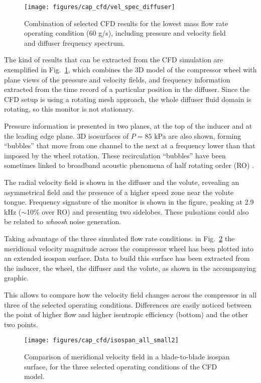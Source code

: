 \begin{figure}[htb!]
\centering
\texttt{[image: figures/cap\_cfd/vel\_spec\_diffuser]}
\caption[CFD results for the lowest mass flow rate condition]{Combination of selected CFD results for the lowest mass flow rate operating condition (60 g/s), including pressure and velocity field and diffuser frequency spectrum.}
\label{fig:vel_spec_diffuser}
\end{figure}

The kind of results that can be extracted from the CFD simulation are exemplified in Fig.~\ref{fig:vel_spec_diffuser}, which combines the 3D model of the compressor wheel with plane views of the pressure and velocity fields, and frequency information extracted from the time record of a particular position in the diffuser. Since the CFD setup is using a rotating mesh approach, the whole diffuser fluid domain is rotating, so this monitor is not stationary.

Pressure information is presented in two planes, at the top of the inducer and at the leading edge plane. 3D isosurfaces of $P = 85$ kPa are also shown, forming ``bubbles'' that move from one channel to the next at a frequency lower than that imposed by the wheel rotation. These recirculation ``bubbles'' have been sometimes linked to broadband acoustic phenomena of half rotating order (RO) \cite{sundstrom2015centrifugal,sundstrom2014assessment}.

The radial velocity field is shown in the diffuser and the volute, revealing an asymmetrical field and the presence of a higher speed zone near the volute tongue. Frequency signature of the monitor is shown in the figure, peaking at 2.9 kHz ($\sim$10\% over RO) and presenting two sidelobes. These pulsations could also be related to \emph{whoosh} noise generation.

Taking advantage of the three simulated flow rate conditions. in Fig.~\ref{fig:cfd_isospan_all} the meridional velocity magnitude across the compressor wheel has been plotted into an extended isospan surface. Data to build this surface has been extracted from the inducer, the wheel, the diffuser and the volute, as shown in the accompanying graphic. 

This allows to compare how the velocity field changes across the compressor in all three of the selected operating conditions. Differences are easily noticed between the point of higher flow and higher isentropic efficiency (bottom) and the other two points. 

\begin{figure}[htpb!]
\centering
\texttt{[image: figures/cap\_cfd/isospan\_all\_small2]}
\caption[Comparison of meridional velocity fields]{Comparison of meridional velocity field in a blade-to-blade isospan surface, for the three selected operating conditions of the CFD model.}
\label{fig:cfd_isospan_all}
\end{figure}

